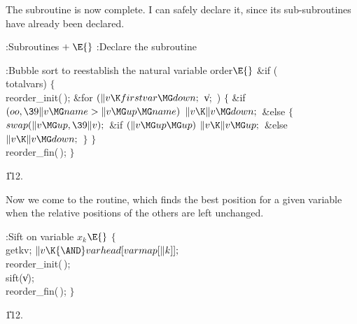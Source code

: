 The  subroutine is now complete. I can safely declare it,
since its sub-subroutines have already been declared.

\Y\B\4:Subroutines\X${}\mathrel+\E{}$\6
:Declare the  subroutine\X\par
\fi

\B{}:Bubble sort to reestablish the natural variable order\X${}\E{}$\6
\&{if} (\\{totalvars})\5
${}\{{}$\1\6
\\{reorder\_init}(\,);\6
\&{for} ${}(\|v\K\\{firstvar}\MG\\{down};{}$ \|v; \,)\5
${}\{{}$\1\6
\&{if} ${}(\\{oo},\39\|v\MG\\{name}>\|v\MG\\{up}\MG\\{name}){}$\1\5
${}\|v\K\|v\MG\\{down};{}$\2\6
\&{else}\5
${}\{{}$\1\6
${}\\{swap}(\|v\MG\\{up},\39\|v);{}$\6
\&{if} ${}(\|v\MG\\{up}\MG\\{up}){}$\1\5
${}\|v\K\|v\MG\\{up};{}$\2\6
\&{else}\1\5
${}\|v\K\|v\MG\\{down};{}$\2\6
\4${}\}{}$\2\6
\4${}\}{}$\2\6
\\{reorder\_fin}(\,);\6
\4${}\}{}$\2\par
\U112.\fi

Now we come to the  routine, which finds the best position
for a given variable when the relative positions of the others
are left unchanged.

\Y\B\4:Sift on variable $x_k$\X${}\E{}$\6
${}\{{}$\1\6
\\{getkv};\5
${}\|v\K{\AND}\\{varhead}[\\{varmap}[\|k]];{}$\6
\\{reorder\_init}(\,);\6
\\{sift}(\|v);\6
\\{reorder\_fin}(\,);\6
\4${}\}{}$\2\par
\U112.\fi

